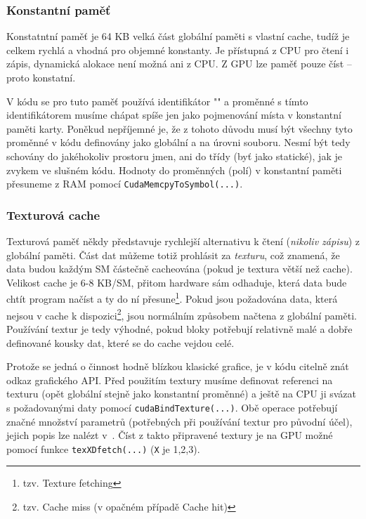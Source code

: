     \subsubsection{Konstantní paměť}

    Konstatntní paměť je 64 KB velká část globální paměti s vlastní cache, tudíž je celkem rychlá a vhodná pro objemné konstanty. Je přístupná z CPU pro čtení i zápis, dynamická alokace není možná ani z CPU. Z GPU lze paměť pouze číst -- proto konstatní.

    V kódu se pro tuto paměť používá identifikátor \Vr"" a proměnné s tímto identifikátorem musíme chápat spíše jen jako pojmenování místa v konstantní paměti karty. Poněkud nepříjemné je, že z tohoto důvodu musí být všechny tyto proměnné v kódu definovány jako globální a na úrovni souboru. Nesmí být tedy schovány do jakéhokoliv prostoru jmen, ani do třídy (byť jako statické), jak je zvykem ve slušném \Cpp kódu. Hodnoty do proměnných (polí) v konstantní paměti přesuneme z RAM pomocí {\tt CudaMemcpyToSymbol(...)}.

    \subsubsection{Texturová cache}

    Texturová paměť někdy představuje rychlejší alternativu k čtení (\emph{nikoliv zápisu}) z globální paměti. Část dat můžeme totiž prohlásit za \emph{texturu}, což znamená, že data budou každým SM částečně cacheována (pokud je textura větší než cache). Velikost cache je 6-8 KB/SM, přitom hardware sám odhaduje, která data bude chtít program načíst a ty do ní přesune\footnote{tzv. Texture fetching}. Pokud jsou požadována data, která nejsou v cache k dispozici\footnote{tzv. Cache miss (v opačném případě Cache hit)}, jsou normálním způsobem načtena z globální paměti. Používání textur je tedy výhodné, pokud bloky potřebují relativně malé a dobře definované kousky dat, které se do cache vejdou celé.

    Protože se jedná o činnost hodně blízkou klasické grafice, je v kódu citelně znát odkaz grafického API. Před použitím textury musíme definovat referenci na texturu (opět globální stejně jako konstantní proměnné) a ještě na CPU ji svázat s požadovanými daty pomocí {\tt cudaBindTexture(...)}. Obě operace potřebují značné množství parametrů (potřebných při používání textur pro původní účel), jejich popis lze nalézt v~\cite{CUDA programming g.}. Číst z takto připravené textury je na GPU možné pomocí funkce {\tt texXDfetch(...)} ({\tt X} je 1,2,3).

